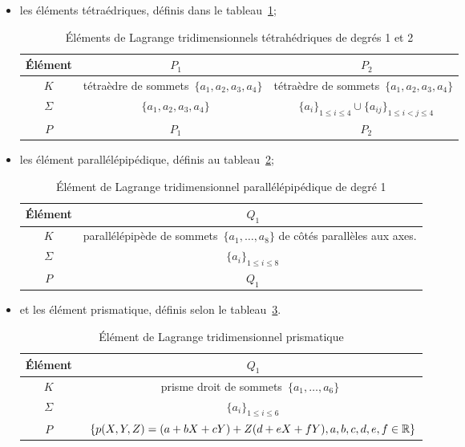 \begin{itemize}
\item les éléments tétraédriques, définis dans le tableau~\ref{tab:Elem:tri};
\begin{table}[ht]\centering\small
\begin{tabular}{c|cc}
Élément &~$P_1$ &~$P_2$ \\
\hline
$K$	  & tétraèdre de sommets~$\{a_1, a_2, a_3, a_4\}$ & tétraèdre de sommets~$\{a_1, a_2, a_3, a_4\}$\\
$\Sigma$ &~$\{a_1, a_2, a_3, a_4\}$ &~$\{a_i\}_{1\le i\le4}\cup\{a_{ij}\}_{1\le i<j\le 4}$ \\
$P$   &~$P_1$ &~$P_2$ \\
\hline
\end{tabular}
\caption{Éléments de Lagrange tridimensionnels tétrahédriques de degrés 1 et 2}\label{tab:Elem:tri}
\end{table}
\item les élément parallélépipédique, définis au tableau~\ref{tab:Elem:para};
\begin{table}[ht]\centering\small
\begin{tabular}{c|c}
Élément &~$Q_1$\\
\hline
$K$ & parallélépipède de sommets~$\{a_1,\ldots, a_8\}$ de côtés parallèles aux axes.\\
$\Sigma$ &~$\{a_i\}_{1\le i\le8}$\\
$P$ &~$Q_1$\\
\hline
\end{tabular}
\caption{Élément de Lagrange tridimensionnel parallélépipédique de degré 1}\label{tab:Elem:para}
\end{table}
\item et les élément prismatique, définis selon le tableau~\ref{tab:Elem:pri}.
\begin{table}[ht]\centering\small
\begin{tabular}{c|c}
Élément &~$Q_1$\\
\hline
$K$ & prisme droit de sommets~$\{a_1,\ldots, a_6\}$\\
$\Sigma$ &~$\{a_i\}_{1\le i\le6}$\\
$P$ &~$\{p(X,Y,Z) = (a + bX + cY ) + Z(d + eX + fY ), a,b,c,d,e,f\in\mathbb R\}$\\
\hline
\end{tabular}
\caption{Élément de Lagrange tridimensionnel prismatique}\label{tab:Elem:pri}
\end{table}
\end{itemize}


